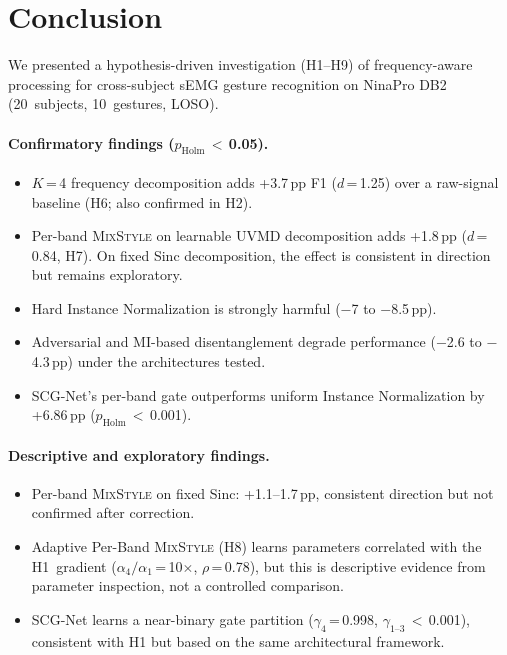 \documentclass[conference]{IEEEtran}
\newcommand{\pp}{\,pp}
\newcommand{\mixstyle}{\textsc{MixStyle}}
\newcommand{\uvmd}{\textsc{UVMD}}
\begin{document}
\section{Conclusion}
\label{sec:conclusion}

We presented a hypothesis-driven investigation (H1--H9) of frequency-aware processing for cross-subject sEMG gesture recognition on NinaPro DB2 (20~subjects, 10~gestures, LOSO).

\paragraph{Confirmatory findings ($p_{\mathrm{Holm}}$\,$<$\,0.05).}
\begin{itemize}
    \item $K$\,=\,4 frequency decomposition adds +3.7\pp{} F1 ($d$\,=\,1.25) over a raw-signal baseline (H6; also confirmed in H2).
    \item Per-band \mixstyle{} on learnable \uvmd{} decomposition adds +1.8\pp{} ($d$\,=\,0.84, H7). On fixed Sinc decomposition, the effect is consistent in direction but remains exploratory.
    \item Hard Instance Normalization is strongly harmful ($-$7 to $-$8.5\pp{}).
    \item Adversarial and MI-based disentanglement degrade performance ($-$2.6 to $-$4.3\pp{}) under the architectures tested.
    \item SCG-Net's per-band gate outperforms uniform Instance Normalization by +6.86\pp{} ($p_{\mathrm{Holm}}$\,$<$\,0.001).
\end{itemize}

\paragraph{Descriptive and exploratory findings.}
\begin{itemize}
    \item Per-band \mixstyle{} on fixed Sinc: +1.1--1.7\pp{}, consistent direction but not confirmed after correction.
    \item Adaptive Per-Band \mixstyle{} (H8) learns parameters correlated with the H1~gradient ($\alpha_4/\alpha_1$\,=\,10$\times$, $\rho$\,=\,0.78), but this is descriptive evidence from parameter inspection, not a controlled comparison.
    \item SCG-Net learns a near-binary gate partition ($\gamma_4$\,=\,0.998, $\gamma_{1\text{--}3}$\,$<$\,0.001), consistent with H1 but based on the same architectural framework.
\end{itemize}
\end{document}
